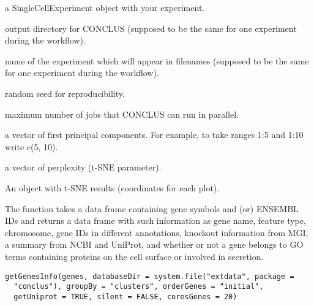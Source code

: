 \documentclass[a4paper]{book}
\begin{document}
\begin{Arguments}
\begin{ldescription}
\item[\code{sceObject}] a SingleCellExperiment object with your experiment.

\item[\code{dataDirectory}] output directory for CONCLUS (supposed to be the same for one experiment during the workflow).

\item[\code{experimentName}] name of the experiment which will appear in filenames (supposed to be the same for one experiment during the workflow).

\item[\code{randomSeed}] random seed for reproducibility.

\item[\code{cores}] maximum number of jobs that CONCLUS can run in parallel.

\item[\code{PCs}] a vector of first principal components.
For example, to take ranges 1:5 and 1:10 write c(5, 10).

\item[\code{perplexities}] a vector of perplexity (t-SNE parameter).
\end{ldescription}
\end{Arguments}
%
\begin{Value}
An object with t-SNE results (coordinates for each plot).
\end{Value}
%
\begin{Description}\relax
The function takes a data frame containing gene symbols and (or) ENSEMBL IDs and returns
a data frame with such information as gene name, feature type, chromosome,
gene IDs in different annotations, knockout information from MGI, a summary from NCBI 
and UniProt, and whether or not a gene belongs to GO terms containing proteins on the cell surface or 
involved in secretion.
\end{Description}
%
\begin{Usage}
\begin{verbatim}
getGenesInfo(genes, databaseDir = system.file("extdata", package =
  "conclus"), groupBy = "clusters", orderGenes = "initial",
  getUniprot = TRUE, silent = FALSE, coresGenes = 20)
\end{verbatim}
\end{Usage}
%
\end{document}
